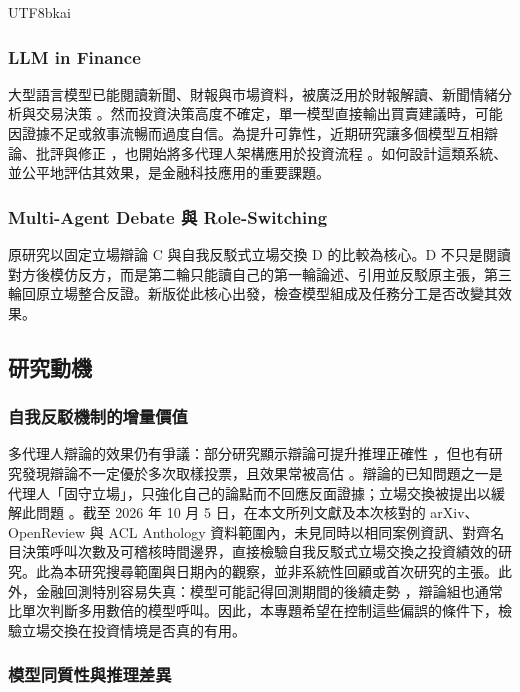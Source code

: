 \documentclass[12pt,a4paper]{article}
\begin{document}
\begin{CJK}{UTF8}{bkai}
\subsubsection{LLM in Finance}
大型語言模型已能閱讀新聞、財報與市場資料，被廣泛用於財報解讀、新聞情緒分析與交易決策 \citep{lopezlira2023chatgpt,araci2019finbert,liu2023fingpt}。然而投資決策高度不確定，單一模型直接輸出買賣建議時，可能因證據不足或敘事流暢而過度自信。為提升可靠性，近期研究讓多個模型互相辯論、批評與修正 \citep{du2023debate,liang2023divergent}，也開始將多代理人架構應用於投資流程 \citep{xiao2024tradingagents,zhang2024stockagent}。如何設計這類系統、並公平地評估其效果，是金融科技應用的重要課題。
\subsubsection{Multi-Agent Debate 與 Role-Switching}

原研究以固定立場辯論 C 與自我反駁式立場交換 D 的比較為核心。D 不只是閱讀對方後模仿反方，而是第二輪只能讀自己的第一輪論述、引用並反駁原主張，第三輪回原立場整合反證。新版從此核心出發，檢查模型組成及任務分工是否改變其效果。

\subsection{研究動機}

\subsubsection{自我反駁機制的增量價值}
多代理人辯論的效果仍有爭議：部分研究顯示辯論可提升推理正確性 \citep{du2023debate}，但也有研究發現辯論不一定優於多次取樣投票，且效果常被高估 \citep{smit2023mad,zhang2025stop}。辯論的已知問題之一是代理人「固守立場」，只強化自己的論點而不回應反面證據；立場交換被提出以緩解此問題 \citep{liu2025roleswitch,chowdhury2026proclaim}。截至 2026 年 10 月 5 日，在本文所列文獻及本次核對的 arXiv、OpenReview 與 ACL Anthology 資料範圍內，未見同時以相同案例資訊、對齊名目決策呼叫次數及可稽核時間邊界，直接檢驗自我反駁式立場交換之投資績效的研究。此為本研究搜尋範圍與日期內的觀察，並非系統性回顧或首次研究的主張。此外，金融回測特別容易失真：模型可能記得回測期間的後續走勢 \citep{glasserman2023lookahead,kong2026bias}，辯論組也通常比單次判斷多用數倍的模型呼叫。因此，本專題希望在控制這些偏誤的條件下，檢驗立場交換在投資情境是否真的有用。
\subsubsection{模型同質性與推理差異}


\end{CJK}
\end{document}

